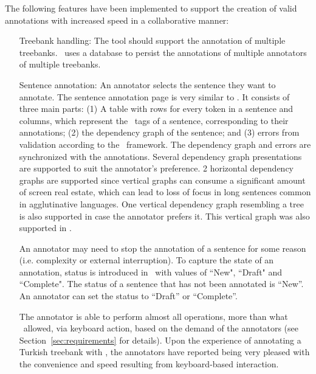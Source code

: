 The following features have been implemented to support the creation of valid annotations with increased speed in a collaborative manner:
\begin{itemize}[before=\normalfont, font=\itshape, align=left,noitemsep,topsep=0pt,parsep=3pt,partopsep=0pt,labelsep=3pt,align=left]
    \item[Treebank handling:]
        The tool should support the annotation of multiple treebanks.
        \boatvtwo\ uses a database to persist the annotations of multiple annotators of multiple treebanks.

    \item[Sentence annotation:]
    	An annotator selects the sentence they want to annotate.
        The sentence annotation page is very similar to \boatvone.
        It consists of three main parts: (1) A table with rows for every token in a sentence and columns, which represent the \ud\ tags of a sentence, corresponding to their annotations; (2) the dependency graph of the sentence; and (3) errors from validation according to the \ud\ framework.
        The dependency graph and errors are synchronized with the annotations.
        Several dependency graph presentations are supported to suit the annotator's preference.
        2 horizontal dependency graphs are supported since vertical graphs can consume a significant amount of screen real estate, which can lead to loss of focus in long sentences common in agglutinative languages.
        One vertical dependency graph resembling a tree is also supported in case the annotator prefers it. This vertical graph was also supported in \boatvone.

        An annotator may need to stop the annotation of a sentence for some reason (i.e. complexity or external interruption).
        To capture the state of an annotation, status is introduced in \boatvtwo\ with values of ``New", ``Draft" and ``Complete".
        The status of a sentence that has not been annotated is ``New''.
	    An annotator can set the status to ``Draft'' or ``Complete''.

        The annotator is able to perform almost all operations, more than what \boatvone\ allowed, via keyboard action, based on the demand of the annotators (see Section~\ref{sec:requirements} for details).
        Upon the experience of annotating a Turkish treebank with \boatvone, the annotators have reported being very pleased with the convenience and speed resulting from keyboard-based interaction.


\end{itemize}
